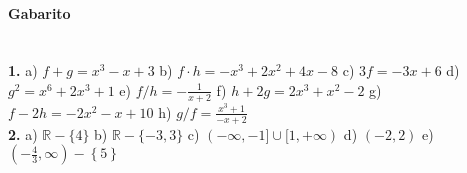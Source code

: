 \documentclass[a4paper,12pt]{article}
\begin{document}
\vspace*{\fill}
{\footnotesize
\paragraph*{Gabarito} \hspace*{\fill}\\
\textbf{1.}  a) $f + g = x^3 - x + 3$
 b) $f \cdot h = -x^3  + 2x^2 + 4x - 8$ 
 c) $3f = -3x + 6$ 
 d) $g^2 = x^6 + 2x^3 + 1$ 
 e) $f/h = -\frac{1}{x + 2}$ 
 f) $h + 2g = 2x^3 + x^2 - 2$ 
 g) $f - 2h = -2x^2 -x+ 10$ 
 h) $g/f = \frac{x^3 + 1}{-x + 2}$\\
\textbf{2.} a) $\mathbb{R} - \{4\}$ 
 b) $\mathbb{R} - \{-3, 3\}$ 
 c) $(-\infty, -1]\cup[1,+\infty)$ 
 d) $(-2, 2)$ 
 e) $\left(-\frac{4}{3},\infty\right) - \left\{ 5 \right\}$ 
}
\end{document}
